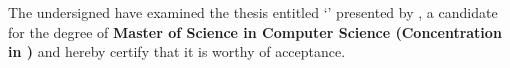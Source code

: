 The undersigned have examined the thesis entitled `\textbf{\paperTitle}' presented by \textbf{\paperAuthor}, a candidate for the degree of \textbf{Master of Science in Computer Science (Concentration in \authorConcentration)} and hereby certify that it is worthy of acceptance.





